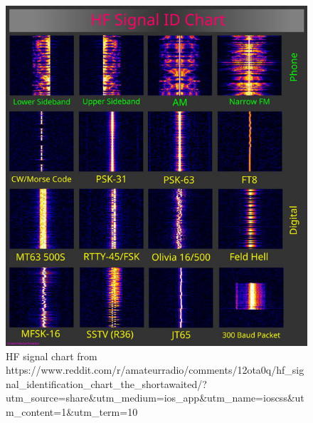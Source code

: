 \documentclass[
  letterpaper,
  DIV=11,
  numbers=noendperiod]{scrreport}
\begin{document}
\begin{figure}

{\centering \includegraphics{include/img/hf-signal-chart-scaled.jpg}

}

\caption{HF signal chart from
https://www.reddit.com/r/amateurradio/comments/12ota0q/hf\_signal\_identification\_chart\_the\_shortawaited/?utm\_source=share\&utm\_medium=ios\_app\&utm\_name=ioscss\&utm\_content=1\&utm\_term=10}

\end{figure}
\end{document}
